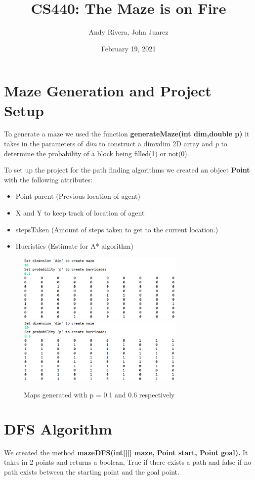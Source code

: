 \documentclass{article}
\title{CS440: The Maze is on Fire}
\author{Andy Rivera, John Juarez}
\date{February 19, 2021}
\begin{document}
\maketitle

\section{Maze Generation and Project Setup}
   To generate a maze we used the function \textbf{generateMaze(int dim,double p)} it takes in the parameters of  \textit{dim} to construct a dimxdim 2D array and \textit{p} to determine the probability of a block being filled(1) or not(0).
   
   To set up the project for the path finding algorithms we created an object \textbf{Point} with the following attributes:
   \begin{itemize}
   \item Point parent (Previous location of agent)
   \item X and Y to keep track of location of agent
   \item stepsTaken (Amount of steps taken to get to the current location.)
   \item Hueristics (Estimate for A* algorithm)
   \end{itemize}

\begin{figure}[hpt]

\centering
\includegraphics[width=3.2in]{maze1}\hfill
\includegraphics[width=3.2in]{maze3}

\caption{Maps generated with p = 0.1 and 0.6 respectively}
\label{fig:figure1}

\end{figure}

\section{DFS Algorithm}
 We created the method \textbf{mazeDFS(int[][] maze, Point start, Point goal).} It takes in 2 points and returns a boolean, True if there exists a path and false if no path exists between the starting point and the goal point. 
	
\end{document}
